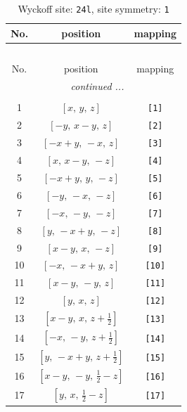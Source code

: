 \documentclass[fleqn,8pt]{jsarticle}
\begin{document}
\begin{longtable}{ccc}
\caption{Wyckoff site: {\tt 24l}, site symmetry: {\tt 1}}
 \\
 \hline \hline
No. & position & mapping \\ \hline \endfirsthead

\multicolumn{2}{l}{\tablename\ \thetable{}} \\
 \hline \hline
No. & position & mapping \\ \hline \endhead

 \hline \hline
\multicolumn{2}{r}{\footnotesize\it continued ...} \\ \endfoot

 \hline \hline
\multicolumn{2}{r}{} \\ \endlastfoot

1 & $\left[ x,\, y,\, z \right]$ & {\tt [1]} \\ \hline
2 & $\left[ - y,\, x - y,\, z \right]$ & {\tt [2]} \\ \hline
3 & $\left[ - x + y,\, - x,\, z \right]$ & {\tt [3]} \\ \hline
4 & $\left[ x,\, x - y,\, - z \right]$ & {\tt [4]} \\ \hline
5 & $\left[ - x + y,\, y,\, - z \right]$ & {\tt [5]} \\ \hline
6 & $\left[ - y,\, - x,\, - z \right]$ & {\tt [6]} \\ \hline
7 & $\left[ - x,\, - y,\, - z \right]$ & {\tt [7]} \\ \hline
8 & $\left[ y,\, - x + y,\, - z \right]$ & {\tt [8]} \\ \hline
9 & $\left[ x - y,\, x,\, - z \right]$ & {\tt [9]} \\ \hline
10 & $\left[ - x,\, - x + y,\, z \right]$ & {\tt [10]} \\ \hline
11 & $\left[ x - y,\, - y,\, z \right]$ & {\tt [11]} \\ \hline
12 & $\left[ y,\, x,\, z \right]$ & {\tt [12]} \\ \hline
13 & $\left[ x - y,\, x,\, z + \frac{1}{2} \right]$ & {\tt [13]} \\ \hline
14 & $\left[ - x,\, - y,\, z + \frac{1}{2} \right]$ & {\tt [14]} \\ \hline
15 & $\left[ y,\, - x + y,\, z + \frac{1}{2} \right]$ & {\tt [15]} \\ \hline
16 & $\left[ x - y,\, - y,\, \frac{1}{2} - z \right]$ & {\tt [16]} \\ \hline
17 & $\left[ y,\, x,\, \frac{1}{2} - z \right]$ & {\tt [17]} \\ \hline

\end{longtable}
\end{document}
